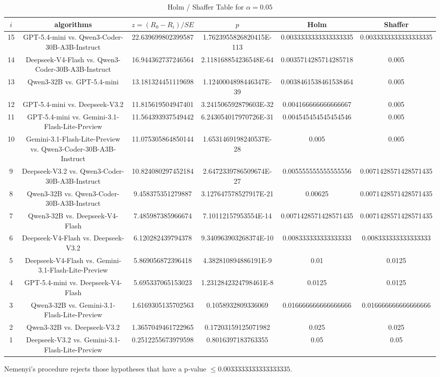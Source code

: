 \documentclass[a4paper,10pt]{article}
\begin{document}
\begin{landscape}
\begin{table}[!htp]
\centering\tiny
\caption{Holm / Shaffer Table for $\alpha=0.05$}
\begin{tabular}{cccccc}
$i$&algorithms&$z=(R_0 - R_i)/SE$&$p$&Holm&Shaffer\\
\hline
15&GPT-5.4-mini vs. Qwen3-Coder-30B-A3B-Instruct&22.639699802399587&1.7623955826820415E-113&0.0033333333333333335&0.0033333333333333335\\14&Deepseek-V4-Flash vs. Qwen3-Coder-30B-A3B-Instruct&16.944362737246564&2.118168854236548E-64&0.0035714285714285718&0.005\\13&Qwen3-32B vs. GPT-5.4-mini&13.181324451119698&1.1240004898446347E-39&0.0038461538461538464&0.005\\12&GPT-5.4-mini vs. Deepseek-V3.2&11.815619504947401&3.241506592879603E-32&0.004166666666666667&0.005\\11&GPT-5.4-mini vs. Gemini-3.1-Flash-Lite-Preview&11.564393937549442&6.243054017970726E-31&0.004545454545454546&0.005\\10&Gemini-3.1-Flash-Lite-Preview vs. Qwen3-Coder-30B-A3B-Instruct&11.075305864850144&1.6531469198240537E-28&0.005&0.005\\9&Deepseek-V3.2 vs. Qwen3-Coder-30B-A3B-Instruct&10.824080297452184&2.6472339786509674E-27&0.005555555555555556&0.0071428571428571435\\8&Qwen3-32B vs. Qwen3-Coder-30B-A3B-Instruct&9.458375351279887&3.127647578527917E-21&0.00625&0.0071428571428571435\\7&Qwen3-32B vs. Deepseek-V4-Flash&7.485987385966674&7.10112157953554E-14&0.0071428571428571435&0.0071428571428571435\\6&Deepseek-V4-Flash vs. Deepseek-V3.2&6.120282439794378&9.340963903268374E-10&0.008333333333333333&0.008333333333333333\\5&Deepseek-V4-Flash vs. Gemini-3.1-Flash-Lite-Preview&5.869056872396418&4.382810894886191E-9&0.01&0.0125\\4&GPT-5.4-mini vs. Deepseek-V4-Flash&5.695337065153023&1.2312842324798461E-8&0.0125&0.0125\\3&Qwen3-32B vs. Gemini-3.1-Flash-Lite-Preview&1.6169305135702563&0.1058932809336069&0.016666666666666666&0.016666666666666666\\2&Qwen3-32B vs. Deepseek-V3.2&1.3657049461722965&0.17203159125071982&0.025&0.025\\1&Deepseek-V3.2 vs. Gemini-3.1-Flash-Lite-Preview&0.2512255673979598&0.8016397183763355&0.05&0.05\\\hline
\end{tabular}
\end{table}
Nemenyi's procedure rejects those hypotheses that have a p-value $\le0.0033333333333333335$.



\end{landscape}
\end{document}

